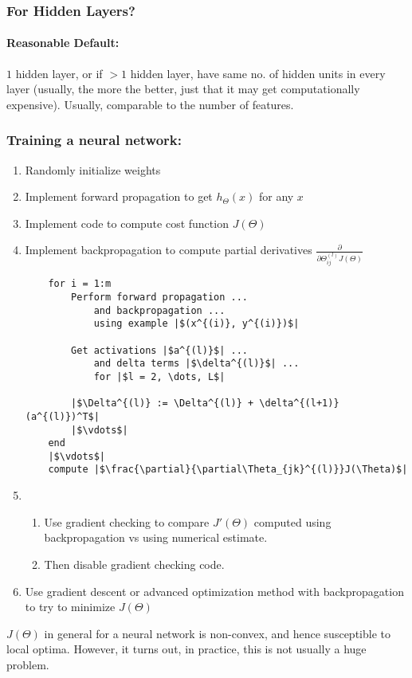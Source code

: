 \subsubsection{For Hidden Layers?}
\paragraph{Reasonable Default:} $1$ hidden layer, or if $>1$ hidden layer, have same
no. of hidden units in every layer (usually, the more the better, just that it may
get computationally expensive). Usually, comparable to the number of features.

\subsubsection{Training a neural network:}
\begin{enumerate}
	\item Randomly initialize weights
	\item Implement forward propagation to get $h_\Theta(x)$ for any $x$
	\item Implement code to compute cost function $J(\Theta)$
	\item Implement backpropagation to compute partial derivatives
	      $\frac{\partial}{\partial\Theta_{ij}^{(l)}J(\Theta)}$
	      \begin{verbatim}
	for i = 1:m
		Perform forward propagation ... 
			and backpropagation ... 
			using example |$(x^{(i)}, y^{(i)})$|
				
		Get activations |$a^{(l)}$| ... 
			and delta terms |$\delta^{(l)}$| ... 
			for |$l = 2, \dots, L$|

		|$\Delta^{(l)} := \Delta^{(l)} + \delta^{(l+1)}(a^{(l)})^T$|
		|$\vdots$|
	end
	|$\vdots$|
	compute |$\frac{\partial}{\partial\Theta_{jk}^{(l)}}J(\Theta)$|
\end{verbatim}
	\item \begin{enumerate}
		      \item Use gradient checking to compare $J'(\Theta)$ computed using
		            backpropagation vs using numerical estimate.
		      \item Then disable gradient checking code.
	      \end{enumerate}
	\item Use gradient descent or advanced optimization method with backpropagation
	      to try to minimize $J(\Theta)$
\end{enumerate}

$J(\Theta)$ in general for a neural network is non-convex, and hence susceptible to
local optima. However, it turns out, in practice, this is not usually a huge problem.

